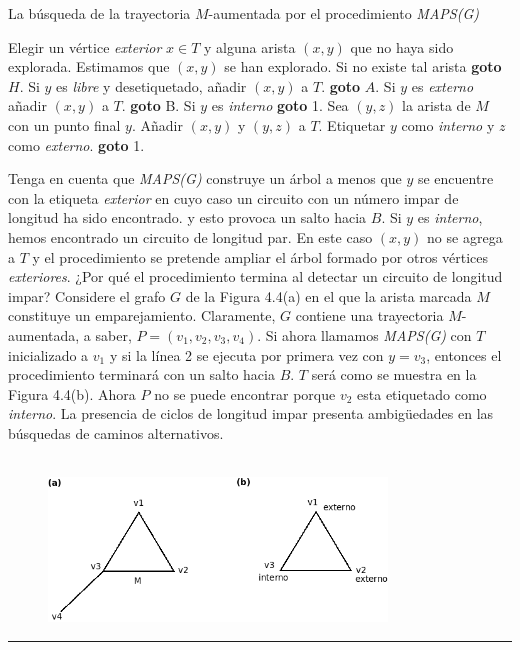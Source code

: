 \documentclass[10pt,a5paper]{book}
\begin{document}
\hfill
\pagebreak
\begin{algorithm}[H]
\caption{La búsqueda de la trayectoria $M$-aumentada por el procedimiento \emph{MAPS(G)}}

\BlankLine
\dontprintsemicolon
Elegir un vértice \emph{exterior} $x \in T$ y alguna arista $(x,y)$ que no haya sido explorada. Estimamos que $(x,y)$ se han explorado. Si no existe tal arista \textbf{goto} $H$.\;
Si $y$ es \emph{libre} y desetiquetado, añadir $(x,y)$ a $T$. \textbf{goto} $A$.\;
Si $y$ es \emph{externo} añadir $(x,y)$ a $T$. \textbf{goto} B.\;
Si $y$ es \emph{interno} \textbf{goto} 1.\;
Sea $(y,z)$ la arista de $M$ con un punto final $y$. Añadir $(x,y)$ y $(y,z)$ a $T$. Etiquetar $y$ como \emph{interno} y $z$ como \emph{externo}. \textbf{goto} 1.\;
\end{algorithm}


Tenga en cuenta que \emph{MAPS(G)} construye un árbol a menos que $y$ se encuentre con la etiqueta \emph{exterior} en cuyo caso un circuito con un número impar de longitud ha sido encontrado. y esto provoca un salto hacia $B$. Si $y$ es \emph{interno}, hemos encontrado un circuito de longitud par. En este caso $(x,y)$ no se agrega a $T$ y el procedimiento se pretende ampliar el árbol formado por otros vértices \emph{exteriores}. ¿Por qué el procedimiento termina al detectar un circuito de longitud impar? Considere el grafo $G$ de la Figura 4.4(a) en el que la arista marcada $M$ constituye un emparejamiento. Claramente, $G$ contiene una trayectoria $M$-aumentada, a saber, $P = (v_1, v_2, v_3, v_4)$. Si ahora llamamos \emph{MAPS(G)} con $T$ inicializado a $v_1$ y si la línea 2 se ejecuta por primera vez con $y = v_3$, entonces el procedimiento terminará con un salto hacia $B$. $T$ será como se muestra en la Figura 4.4(b). Ahora $P$ no se puede encontrar porque $v_2$ esta etiquetado como \emph{interno}. La presencia de ciclos de longitud impar presenta ambigüedades en las búsquedas de caminos alternativos.

\begin{figure}[H]
\caption{ }
\hrulefill{}\\
\includegraphics[width=9cm]{Fig4_4.png}
\end{figure}
\hrule{}
\end{document}
